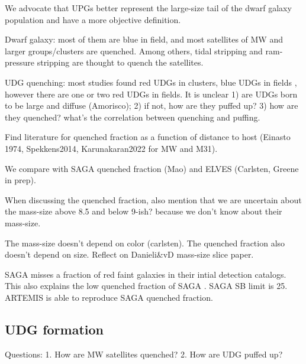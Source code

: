 \documentclass[twocolumn,astrosymb,twocolappendix]{aastex631}
\newcommand{\sbunit}{\mathrm{mag\ arcsec}^{-2}}
\newcommand{\sbeff}{\overline{\mu}_{\mathrm{eff}}(g)}
\begin{document}
\begin{CJK*}{UTF8}{gbsn}

We advocate that UPGs better represent the large-size tail of the dwarf galaxy population and have a more objective definition. 

Dwarf galaxy: most of them are blue in field, and most satellites of MW and larger groups/clusters are quenched. Among others, tidal stripping and ram-pressure stripping are thought to quench the satellites. 


UDG quenching: most studies found red UDGs in clusters, blue UDGs in fields \citep{Prole2019,Leisman2017}, however there are one or two red UDGs in fields. It is unclear 1) are UDGs born to be large and diffuse (Amorisco); 2) if not, how are they puffed up? 3) how are they quenched? what's the correlation between quenching and puffing. 

Find literature for quenched fraction as a function of distance to host (Einasto 1974, Spekkens2014, Karunakaran2022 for MW and M31).

We compare with SAGA quenched fraction (Mao) and ELVES (Carlsten, Greene in prep).




When discussing the quenched fraction, also mention that we are uncertain about the mass-size above 8.5 and below 9-ish? because we don't know about their mass-size.

The mass-size doesn't depend on color (carlsten). The quenched fraction also doesn't depend on size. Reflect on Danieli\&vD mass-size slice paper. 

SAGA misses a fraction of red faint galaxies in their intial detection catalogs. This also explains the low quenched fraction of SAGA \citep{CarlstenELVES2022}.
SAGA SB limit is 25. ARTEMIS is able to reproduce SAGA quenched fraction. 



\subsection{UDG formation}
Questions:
1. How are MW satellites quenched? 
2. How are UDG puffed up?


\end{CJK*}
\end{document}
